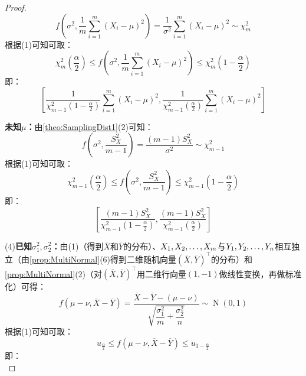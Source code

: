 \begin{proof}
	\begin{equation*}
		f\left(\sigma^2,\frac{1}{m}\sum_{i=1}^{m}(X_i-\mu)^2\right)=\frac{1}{\sigma^2}\sum_{i=1}^{m}(X_i-\mu)^2\sim\chi_{m}^2
	\end{equation*}
	根据(1)可知可取：
	\begin{equation*}
		\chi_{m}^2\left(\frac{\alpha}{2}\right)\leqslant f\left(\sigma^2,\frac{1}{m}\sum_{i=1}^{m}(X_i-\mu)^2\right)\leqslant\chi_{m}^2\left(1-\frac{\alpha}{2}\right)
	\end{equation*}
	即：
	\begin{equation*}
		\left[\frac{1}{\chi_{m-1}^2\left(1-\frac{\alpha}{2}\right)}\sum_{i=1}^{m}(X_i-\mu)^2,\frac{1}{\chi_{m-1}^2\left(\frac{\alpha}{2}\right)}\sum_{i=1}^{m}(X_i-\mu)^2\right]
	\end{equation*}\par
	\textbf{未知$\mu$：}由\cref{theo:SamplingDist1}(2)可知：
	\begin{equation*}
		f\left(\sigma^2,\frac{S_X^2}{m-1}\right)=\frac{(m-1)S_X^2}{\sigma^2}\sim\chi_{m-1}^2
	\end{equation*}
	根据(1)可知可取：
	\begin{equation*}
		\chi_{m-1}^2\left(\frac{\alpha}{2}\right)\leqslant f\left(\sigma^2,\frac{S_X^2}{m-1}\right)\leqslant\chi_{m-1}^2\left(1-\frac{\alpha}{2}\right)
	\end{equation*}
	即：
	\begin{equation*}
		\left[\frac{(m-1)S_X^2}{\chi_{m-1}^2\left(1-\frac{\alpha}{2}\right)},\frac{(m-1)S_X^2}{\chi_{m-1}^2\left(\frac{\alpha}{2}\right)}\right]
	\end{equation*}\par
	(4)\textbf{已知$\sigma_1^2,\sigma_2^2$：}由(1)（得到$\overline{X}$和$\overline{Y}$的分布）、$X_1, X_2, \dots, X_{m}$与$Y_1, Y_2, \dots, Y_{n}$相互独立（由\cref{prop:MultiNormal}(6)得到二维随机向量$(\overline{X},\overline{Y})^{\top}$的分布）和\cref{prop:MultiNormal}(2)（对$(\overline{X},\overline{Y})^{\top}$用二维行向量$(1,-1)$做线性变换，再做标准化）可得：
	\begin{equation*}
		f(\mu-\nu,\overline{X}-\overline{Y})=\frac{\overline{X}-\overline{Y}-(\mu-\nu)}{\sqrt{\dfrac{\sigma_1^2}{m}+\dfrac{\sigma_2^2}{n}}}\sim\operatorname{N}\left(0,1\right)
	\end{equation*}
	根据(1)可知可取：
	\begin{equation*}
		u_{\frac{\alpha}{2}}\leqslant f(\mu-\nu,\overline{X}-\overline{Y})\leqslant u_{1-\frac{\alpha}{2}}
	\end{equation*}
	即：
	\begin{equation*}

\end{equation*}
\end{proof}
